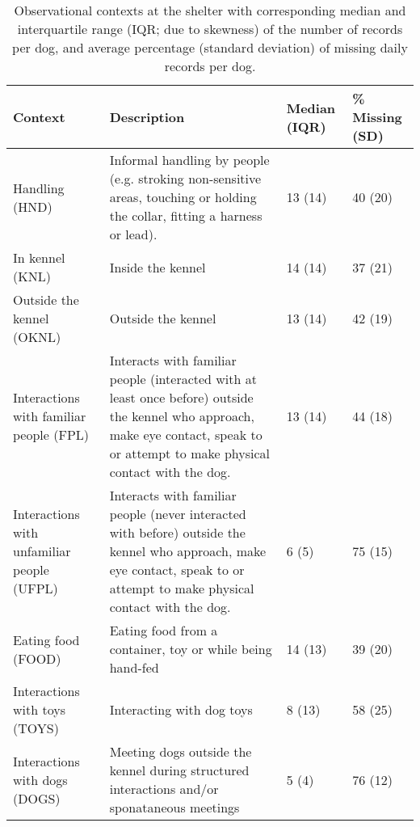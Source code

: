 \documentclass[fleqn,10pt]{wlscirep}
\begin{document}
\begin{table}[t!]
  \centering
  \small
  \begin{tabular}{p{4cm}p{6cm}p{3cm}p{3cm}}
    \textbf{Context} & \textbf{Description} & \textbf{Median (IQR)} & \textbf{\% Missing (SD)}\\ \hline
    Handling (HND) & \footnotesize{Informal handling by people (e.g. stroking non-sensitive areas, touching or holding the collar, fitting a harness or lead).} & 13 (14) & 40 (20) \\
    In kennel (KNL) & \footnotesize{Inside the kennel} & 14 (14) & 37 (21) \\
    Outside the kennel (OKNL) & \footnotesize{Outside the kennel} & 13 (14) & 42 (19)\\
    Interactions with familiar people (FPL) & \footnotesize{Interacts with familiar people (interacted with at least once before) outside the kennel who approach, make eye contact, speak to or attempt to make physical contact with the dog.} & 13 (14) & 44 (18)\\
    Interactions with unfamiliar people (UFPL) & \footnotesize{Interacts with familiar people (never interacted with before) outside the kennel who approach, make eye contact, speak to or attempt to make physical contact with the dog.} & 6 (5) & 75 (15)\\
    Eating food (FOOD) & \footnotesize{Eating food from a container, toy or while being hand-fed} & 14 (13) & 39 (20)\\
    Interactions with toys (TOYS) & \footnotesize{Interacting with dog toys} & 8 (13) & 58 (25) \\
    Interactions with dogs (DOGS) & \footnotesize{Meeting dogs outside the kennel during structured interactions and/or sponataneous meetings} & 5 (4) & 76 (12) \\
    \hline
  \end{tabular}
  \caption{Observational contexts at the shelter with corresponding median and interquartile range (IQR; due to skewness) of the number of records per dog, and average percentage (standard deviation) of missing daily records per dog.}
  \label{table_contexts}
\end{table}
\end{document}

